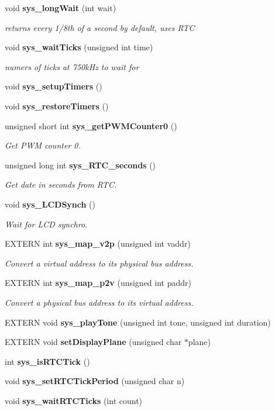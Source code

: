 \begin{CompactItemize}
void {\bf sys\_\-long\-Wait} (int wait)
\begin{CompactList}\small\item\em returns every 1/8th of a second by default, uses RTC\item\end{CompactList}\item 
void {\bf sys\_\-wait\-Ticks} (unsigned int time)
\begin{CompactList}\small\item\em numers of ticks at 750k\-Hz to wait for\item\end{CompactList}\item 
void {\bf sys\_\-setup\-Timers} ()
\item 
void {\bf sys\_\-restore\-Timers} ()
\item 
unsigned short int {\bf sys\_\-get\-PWMCounter0} ()
\begin{CompactList}\small\item\em Get PWM counter 0.\item\end{CompactList}\item 
unsigned long int {\bf sys\_\-RTC\_\-seconds} ()
\begin{CompactList}\small\item\em Get date in seconds from RTC.\item\end{CompactList}\item 
void {\bf sys\_\-LCDSynch} ()
\begin{CompactList}\small\item\em Wait for LCD synchro.\item\end{CompactList}\item 
EXTERN int {\bf sys\_\-map\_\-v2p} (unsigned int vaddr)
\begin{CompactList}\small\item\em Convert a virtual address to its physical bus address.\item\end{CompactList}\item 
EXTERN int {\bf sys\_\-map\_\-p2v} (unsigned int paddr)
\begin{CompactList}\small\item\em Convert a physical bus address to its virtual address.\item\end{CompactList}\item 
EXTERN void {\bf sys\_\-play\-Tone} (unsigned int tone, unsigned int duration)
\item 
EXTERN void {\bf set\-Display\-Plane} (unsigned char $\ast$plane)
\item 
int {\bf sys\_\-is\-RTCTick} ()
\item 
void {\bf sys\_\-set\-RTCTick\-Period} (unsigned char n)
\item 
void {\bf sys\_\-wait\-RTCTicks} (int count)
\end{CompactItemize}
